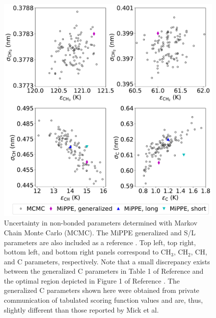 \documentclass[preprint,review,12pt]{elsarticle}
\begin{document}
    \begin{figure}[H]
    	\centering
    	\includegraphics[width=6.4in]{MCMC_nonbonded.pdf}
    	\caption{Uncertainty in non-bonded parameters determined with Markov Chain Monte Carlo (MCMC). The MiPPE generalized and S/L parameters are also included as a reference \cite{Mie,Potoff_branched}. Top left, top right, bottom left, and bottom right panels correspond to CH$_3$, CH$_2$, CH, and C parameters, respectively. Note that a small discrepancy exists between the generalized C parameters in Table 1 of Reference  and the optimal region depicted in Figure 1 of Reference . The generalized C parameters shown here were obtained from private communication of tabulated scoring function values and are, thus, slightly different than those reported by Mick et al.\cite{Potoff_branched}}		
    	\label{fig:nonbonded_uncertainty}
    \end{figure}
    
	
\end{document}
